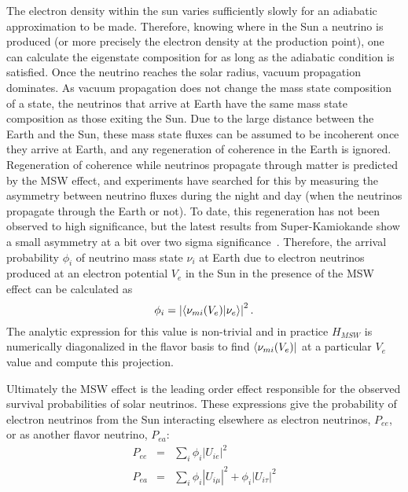 The electron density within the sun varies sufficiently slowly for an adiabatic approximation to be made.
Therefore, knowing where in the Sun a neutrino is produced (or more precisely the electron density at the production point), one can calculate the eigenstate composition for as long as the adiabatic condition is satisfied.
Once the neutrino reaches the solar radius, vacuum propagation dominates. 
As vacuum propagation does not change the mass state composition of a state, the neutrinos that arrive at Earth have the same mass state composition as those exiting the Sun.
Due to the large distance between the Earth and the Sun, these mass state fluxes can be assumed to be incoherent once they arrive at Earth, and any regeneration of coherence in the Earth is ignored.
Regeneration of coherence while neutrinos propagate through matter is predicted by the MSW effect, and experiments have searched for this by measuring the asymmetry between neutrino fluxes during the night and day (when the neutrinos propagate through the Earth or not).
To date, this regeneration has not been observed to high significance, but the latest results from Super-Kamiokande show a small asymmetry at a bit over two sigma significance~\cite{superk}.
Therefore, the arrival probability $\phi_i$ of neutrino mass state $\nu_i$ at Earth due to electron neutrinos produced at an electron potential $V_e$ in the Sun in the presence of the MSW effect can be calculated as
\begin{equation}
\phi_i = \left| \braket{\nu_{m i}(V_e)}{\nu_e} \right|^2.
\label{rawflux}
\end{equation}
The analytic expression for this value is non-trivial and in practice $H_{MSW}$ is numerically diagonalized in the flavor basis to find $\bra{\nu_{m i}(V_e)}$ at a particular $V_e$ value and compute this projection.

Ultimately the MSW effect is the leading order effect responsible for the observed survival probabilities of solar neutrinos.
These expressions give the probability of electron neutrinos from the Sun interacting elsewhere as electron neutrinos, $P_{ee}$, or as another flavor neutrino, $P_{ea}$:
\begin{equation}
\begin{array}{rcl}
P_{ee} & = & \sum_i \phi_i |U_{ie}|^2  \\
P_{ea} & = & \sum_i \phi_i |U_{i\mu}|^2 + \phi_i |U_{i\tau}|^2
\end{array}
\label{msw_survive}
\end{equation}

